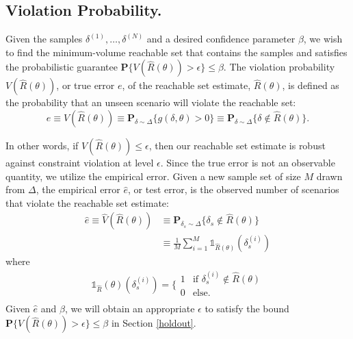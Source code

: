 \documentclass[letterpaper, 10 pt, conference]{ieeeconf}  %
\begin{document}
\subsection{Violation Probability.}  
Given the samples $\delta^{(1)}, \dots, \delta^{(N)}$ and a desired confidence parameter $\beta$, we wish to find the minimum-volume reachable set that contains the samples and satisfies the probabilistic guarantee $\mathbf{P} \{ V(\hat{R}(\theta)) > \epsilon\} \leq \beta$. The violation probability $V(\hat{R}(\theta))$, or true error $e$, of the reachable set estimate, $\hat{R}(\theta)$, is defined as the probability that an unseen scenario will violate the reachable set: 
    \begin{equation}
        e \equiv V(\hat{R}(\theta)) \equiv  \mathbf{P}_{\delta \sim \Delta}\{ g(\delta, \theta) > 0\} \equiv \mathbf{P}_{\delta \sim \Delta}\{ \delta \not\in \hat{R}(\theta) \}.
        \label{eq:true}
    \end{equation}

In other words,  if $V(\hat{R}(\theta)) \leq \epsilon$, then our reachable set estimate is robust against constraint violation at level $\epsilon$. Since the true error is not an observable quantity, we utilize the empirical error. Given a new sample set of size $M$ drawn from $\Delta$, the empirical error $\hat{e}$, or test error, is the observed number of scenarios that violate the reachable set estimate:
\begin{align}
    \hat{e} \equiv \hat{V}(\hat{R}(\theta)) &\equiv  \mathbf{P}_{\delta_s \sim \Delta}\{ \delta_s \not\in \hat{R}(\theta) \} \\
    &\equiv \frac{1}{M}\sum^{M}_{i=1 }\mathds{1}_{\hat{R}(\theta)}(\delta_s^{(i)})
    \label{eq:empirical}
\end{align}
where
\begin{equation}
    \mathds{1}_{\hat{R}}(\theta)(\delta_s^{(i)}) = \Bigg\{ \begin{array}{ll}
      1 & \text{if } \delta_s^{(i)} \notin  \hat{R}(\theta)\\
      0 & \text{else}. \\
\end{array} 
\label{classifier}
\end{equation}
Given %
$\hat{e}$ and $\beta$, we will obtain an appropriate $\epsilon$ to satisfy the bound $\mathbf{P} \{ V(\hat{R}(\theta)) > \epsilon\} \leq \beta$ in Section \ref{holdout}.
\end{document}
